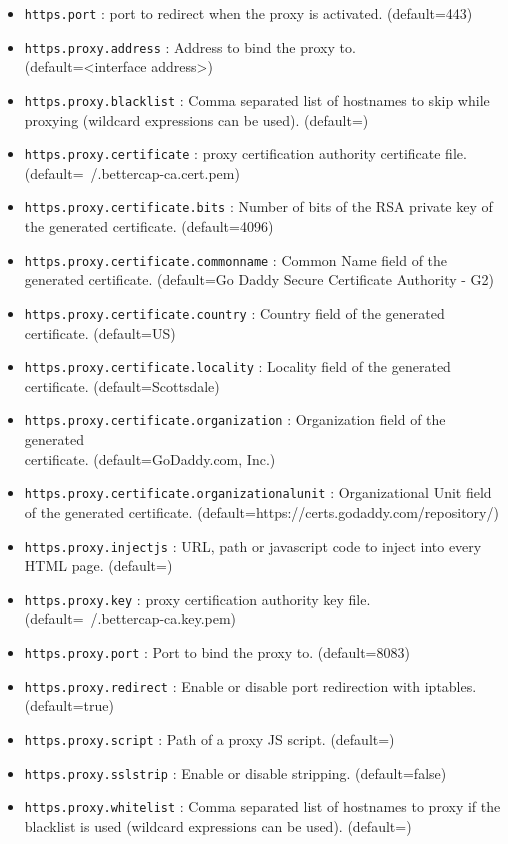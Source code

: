 \begin{itemize}
 \item \verb|https.port| :  port to redirect when the proxy is activated. (default=443)
 \item \verb|https.proxy.address| : Address to bind the  proxy to. \\ (default=<interface address>)
 \item \verb|https.proxy.blacklist| : Comma separated list of hostnames to skip while proxying (wildcard expressions can be used). (default=)
 \item \verb|https.proxy.certificate| :  proxy certification authority  certificate file. (default=~/.bettercap-ca.cert.pem)
 \item \verb|https.proxy.certificate.bits| : Number of bits of the RSA private key of the generated  certificate. (default=4096)
 \item \verb|https.proxy.certificate.commonname| : Common Name field of the generated  certificate. (default=Go Daddy Secure Certificate Authority - G2)
 \item \verb|https.proxy.certificate.country| : Country field of the generated \\  certificate. (default=US)
 \item \verb|https.proxy.certificate.locality| : Locality field of the generated \\  certificate. (default=Scottsdale)
 \item \verb|https.proxy.certificate.organization| : Organization field of the generated \\  certificate. (default=GoDaddy.com, Inc.)
 \item \verb|https.proxy.certificate.organizationalunit| : Organizational Unit field of the generated  certificate. \newline(default=https://certs.godaddy.com/repository/)
 \item \verb|https.proxy.injectjs| : URL, path or javascript code to inject into every HTML page. (default=)
 \item \verb|https.proxy.key| :  proxy certification authority  key file. (default=~/.bettercap-ca.key.pem)
 \item \verb|https.proxy.port| : Port to bind the  proxy to. (default=8083)
 \item \verb|https.proxy.redirect| : Enable or disable port redirection with iptables. (default=true)
 \item \verb|https.proxy.script| : Path of a proxy JS script. (default=)
 \item \verb|https.proxy.sslstrip| : Enable or disable  stripping. (default=false)
 \item \verb|https.proxy.whitelist| : Comma separated list of hostnames to proxy if the blacklist is used (wildcard expressions can be used). (default=)
\end{itemize}

